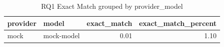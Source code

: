 \begin{table}
\caption{RQ1 Exact Match grouped by provider_model}
\label{tab:rq1_provider_model}
\begin{tabular}{llrr}
\toprule
provider & model & exact_match & exact_match_percent \\
\midrule
mock & mock-model & 0.01 & 1.10 \\
\bottomrule
\end{tabular}
\end{table}
